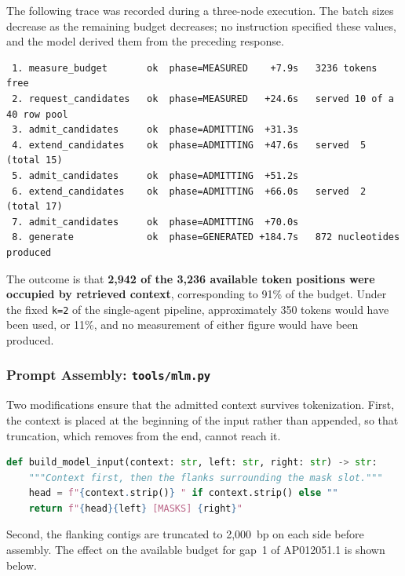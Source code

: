 The following trace was recorded during a three-node execution. The batch sizes decrease as
the remaining budget decreases; no instruction specified these values, and the model derived
them from the preceding response.

\begin{verbatim}
 1. measure_budget       ok  phase=MEASURED    +7.9s   3236 tokens free
 2. request_candidates   ok  phase=MEASURED   +24.6s   served 10 of a 40 row pool
 3. admit_candidates     ok  phase=ADMITTING  +31.3s
 4. extend_candidates    ok  phase=ADMITTING  +47.6s   served  5  (total 15)
 5. admit_candidates     ok  phase=ADMITTING  +51.2s
 6. extend_candidates    ok  phase=ADMITTING  +66.0s   served  2  (total 17)
 7. admit_candidates     ok  phase=ADMITTING  +70.0s
 8. generate             ok  phase=GENERATED +184.7s   872 nucleotides produced
\end{verbatim}

The outcome is that \textbf{2{,}942 of the 3{,}236 available token positions were occupied by
retrieved context}, corresponding to 91\% of the budget. Under the fixed \texttt{k=2} of the
single-agent pipeline, approximately 350 tokens would have been used, or 11\%, and no
measurement of either figure would have been produced.

\subsubsection{Prompt Assembly: \texttt{tools/mlm.py}}

Two modifications ensure that the admitted context survives tokenization. First, the context
is placed at the beginning of the input rather than appended, so that truncation, which
removes from the end, cannot reach it.

\begin{lstlisting}[language=Python]
def build_model_input(context: str, left: str, right: str) -> str:
    """Context first, then the flanks surrounding the mask slot."""
    head = f"{context.strip()} " if context.strip() else ""
    return f"{head}{left} [MASKS] {right}"
\end{lstlisting}

Second, the flanking contigs are truncated to 2{,}000~bp on each side before assembly. The
effect on the available budget for gap~1 of AP012051.1 is shown below.

